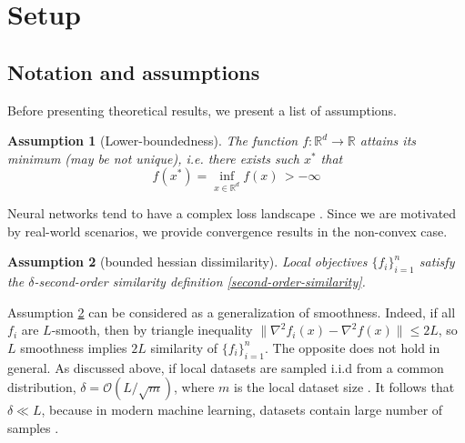 \documentclass{article}
\DeclareMathOperator{\prox}{prox}
\newtheorem{assumption}{Assumption}
\begin{document}
\section{Setup} \label{setup}

\subsection{Notation and assumptions}

Before presenting theoretical results, we present a list of assumptions.




\begin{assumption}[Lower-boundedness]
\label{ass:lower}
The function $f: \mathbb{R}^d \rightarrow \mathbb{R}$ attains its minimum (may be not unique), i.e. there exists such $x^*$ that  
    \[ f(x^*) = \inf_{x \in \mathbb{R}^d} f(x) \, > - \infty \]
\end{assumption}

Neural networks tend to have a complex loss landscape \citep{cybenko1989approximation, nguyen2018optimization}. Since we are motivated by real-world scenarios, we provide convergence results in the non-convex case. 

\begin{assumption}[bounded hessian dissimilarity]
\label{ass:similarity}
    Local objectives $\{f_i\}_{i=1}^n$ satisfy the $\delta$-second-order similarity definition \ref{second-order-similarity}.
\end{assumption}

Assumption \ref{ass:similarity} can be considered as a generalization of smoothness. Indeed, if all $f_i$ are $L$-smooth, then by triangle inequality $\|\nabla^2 f_i(x) - \nabla^2 f(x)\| \leq 2L$, so $L$ smoothness implies $2 L$ similarity of $\{f_i\}_{i=1}^n$. The opposite does not hold in general. As discussed above, if local datasets are sampled i.i.d from a common distribution, $\delta = \mathcal{O}(L/\sqrt{m})$, 
where $m$ is the local dataset size \cite{hendrikx2020statistically}. It follows that $\delta \ll L$, because in modern machine learning, datasets contain large number of samples \cite{kaplan2020scaling}. 
\end{document}
